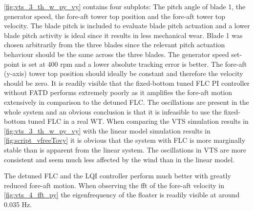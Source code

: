 \cref{fig:vts_3_th_w_py_vy} contains four subplots: The pitch angle of blade 1, the generator speed, the fore-aft tower top position and the fore-aft tower top velocity. The blade pitch is included to evaluate blade pitch actuation and a lower blade pitch activity is ideal since it results in less mechanical wear. Blade 1 was chosen arbitrarily from the three blades since the relevant pitch actuation behaviour should be the same across the three blades. The generator speed set-point is set at 400 rpm and a lower absolute tracking error is better. The fore-aft (y-axis) tower top position should ideally be constant and therefore the velocity should be zero. It is readily visible that the fixed-bottom tuned FLC PI controller without FATD performs extremely poorly as it amplifies the fore-aft motion extensively in comparison to the detuned FLC. The oscillations are present in the whole system and an obvious conclusion is that it is infeasible to use the fixed-bottom tuned FLC in a real WT. When comparing the VTS simulation results in \cref{fig:vts_3_th_w_py_vy} with the linear model simulation results in \cref{fig:script_vfreeTovy} it is obvious that the system with FLC is more marginally stable than is apparent from the linear system. The oscillations in VTS are more consistent and seem much less affected by the wind than in the linear model.

The detuned FLC and the LQI controller perform much better with greatly reduced fore-aft motion. When observing the fft of the fore-aft velocity in \cref{fig:vts_4_fft_py} the eigenfrequency of the floater is readily visible at around 0.035 Hz.

